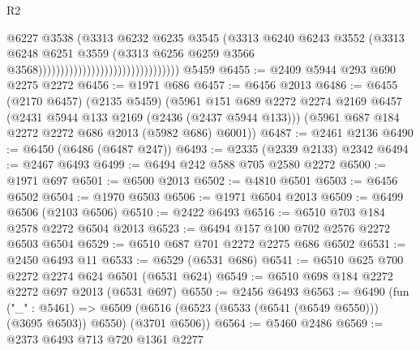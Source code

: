 \begin{lexlean}{R2}
\begin{coremodule}
                                                            @6227
                                                            @3538
                                                            (@3313
                                                              @6232
                                                              @6235
                                                              @3545
                                                              (@3313
                                                                @6240
                                                                @6243
                                                                @3552
                                                                (@3313
                                                                  @6248
                                                                  @6251
                                                                  @3559
                                                                  (@3313
                                                                    @6256
                                                                    @6259
                                                                    @3566
                                                                    @3568))))))))))))))))))))))))))))))))
    @5459
@6455 := @2409 @5944 @293 @690 @2275 @2272
@6456 := @1971 @686
@6457 := @6456 @2013
@6486 := @6455
    (@2170 @6457)
    (@2135 @5459)
    (@5961
      @151
      @689
      @2272
      @2274
      @2169
      @6457
      (@2431 @5944 @133 @2169 (@2436 (@2437 @5944 @133)))
      (@5961 @687 @184 @2272 @2272 @686 @2013 (@5982 @686) @6001))
@6487 := @2461 @2136
@6490 := @6450 (@6486 (@6487 @247))
@6493 := @2335 (@2339 @2133) @2342
@6494 := @2467 @6493
@6499 := @6494 @242 @588 @705 @2580 @2272
@6500 := @1971 @697
@6501 := @6500 @2013
@6502 := @4810 @6501
@6503 := @6456 @6502
@6504 := @1970 @6503
@6506 := @1971 @6504 @2013
@6509 := @6499 @6506 (@2103 @6506)
@6510 := @2422 @6493
@6516 := @6510 @703 @184 @2578 @2272 @6504 @2013
@6523 := @6494 @157 @100 @702 @2576 @2272 @6503 @6504
@6529 := @6510 @687 @701 @2272 @2275 @686 @6502
@6531 := @2450 @6493 @11
@6533 := @6529 (@6531 @686)
@6541 := @6510 @625 @700 @2272 @2274 @624 @6501 (@6531 @624)
@6549 := @6510 @698 @184 @2272 @2272 @697 @2013 (@6531 @697)
@6550 := @2456 @6493
@6563 := @6490
    (fun ("_" : @5461) =>
    @6509 (@6516 (@6523 (@6533 (@6541 (@6549 @6550))) (@3695 @6503)) @6550) (@3701 @6506))
@6564 := @5460 @2486
@6569 := @2373 @6493 @713 @720 @1361 @2277

\end{coremodule}
\end{lexlean}
